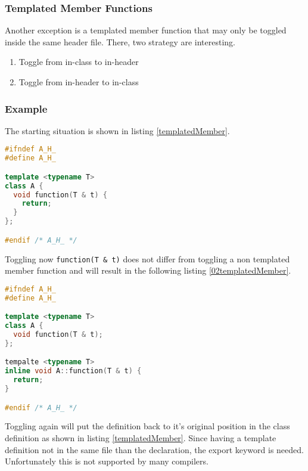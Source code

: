 \subsubsection{Templated Member Functions}

Another exception is a templated member function that may only be toggled
inside the same header file. There, two strategy are interesting.
\begin{enumerate}
\item Toggle from in-class to in-header
\item Toggle from in-header to in-class
\end{enumerate}

\subsubsection*{Example}
\label{templatedmember}

The starting situation is shown in listing \ref{templatedMember}.

\begin{lstlisting}[caption={A.h, in class definition with template parameters},
label={templatedMember}, language=C++]
#ifndef A_H_
#define A_H_

template <typename T>
class A {
  void function(T & t) {
    return;
  }
};

#endif /* A_H_ */
\end{lstlisting}

Toggling now \texttt{function(T \& t)} does not differ from toggling a non
templated member function and will result in the following listing
\ref{02templatedMember}.

\begin{lstlisting}[caption={A.h, in header definition with template parameters},
label={02templatedMember}, language=C++]
#ifndef A_H_
#define A_H_

template <typename T>
class A {
  void function(T & t);
};

tempalte <typename T>
inline void A::function(T & t) {
  return;
}

#endif /* A_H_ */
\end{lstlisting}

Toggling again will put the definition back to it's original position in the
class definition as shown in listing \ref{templatedMember}. Since having a
template definition not in the same file than the declaration, the export
keyword is needed. Unfortunately this is not supported by many compilers.


